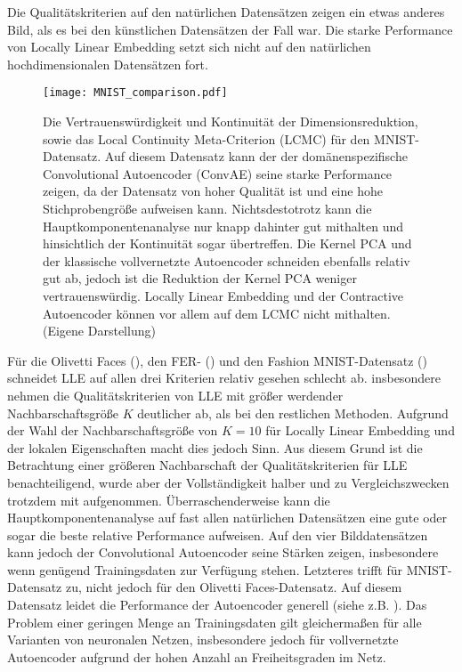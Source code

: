 Die Qualitätskriterien auf den natürlichen Datensätzen zeigen ein etwas anderes Bild, als es bei
den künstlichen Datensätzen der Fall war. Die starke Performance von Locally Linear Embedding setzt
sich nicht auf den natürlichen hochdimensionalen Datensätzen fort.
\begin{figure}[ht]
	\begin{center}
		\texttt{[image: MNIST\_comparison.pdf]}
	\end{center}
	\caption[Qualitätskriterien für MNIST]{Die Vertrauenswürdigkeit und Kontinuität der Dimensionsreduktion, sowie das Local Continuity Meta-Criterion (LCMC) für den MNIST-Datensatz. Auf diesem Datensatz kann der der domänenspezifische Convolutional Autoencoder (ConvAE) seine starke Performance zeigen, da der Datensatz von hoher Qualität ist und eine hohe Stichprobengröße aufweisen kann. Nichtsdestotrotz kann die Hauptkomponentenanalyse nur knapp dahinter gut mithalten und hinsichtlich der Kontinuität sogar übertreffen. Die Kernel PCA und der klassische vollvernetzte Autoencoder schneiden ebenfalls relativ gut ab, jedoch ist die Reduktion der Kernel PCA weniger vertrauenswürdig. Locally Linear Embedding und der Contractive Autoencoder können vor allem auf dem LCMC nicht mithalten. (Eigene Darstellung)}
	\label{fig:MNISTMetrics}
\end{figure}
Für die Olivetti Faces (), den FER- () und den Fashion MNIST-Datensatz ()
schneidet LLE auf allen drei Kriterien relativ gesehen schlecht ab. insbesondere nehmen die
Qualitätskriterien von LLE mit größer werdender Nachbarschaftsgröße $K$ deutlicher ab, als bei den
restlichen Methoden. Aufgrund der Wahl der Nachbarschaftsgröße von $K=10$ für Locally Linear
Embedding und der lokalen Eigenschaften macht dies jedoch Sinn. Aus diesem Grund ist die
Betrachtung einer größeren Nachbarschaft der Qualitätskriterien für LLE benachteiligend, wurde aber
der Vollständigkeit halber und zu Vergleichszwecken trotzdem mit aufgenommen. Überraschenderweise
kann die Hauptkomponentenanalyse auf fast allen natürlichen Datensätzen eine gute oder sogar die
beste relative Performance aufweisen. Auf den vier Bilddatensätzen kann jedoch der Convolutional
Autoencoder seine Stärken zeigen, insbesondere wenn genügend Trainingsdaten zur Verfügung stehen. Letzteres trifft für MNIST-Datensatz  zu, nicht jedoch für den Olivetti Faces-Datensatz.
Auf diesem Datensatz leidet die Performance der Autoencoder generell (siehe z.B. ). Das Problem einer geringen Menge an Trainingsdaten gilt gleichermaßen für alle
Varianten von neuronalen Netzen, insbesondere jedoch für vollvernetzte Autoencoder aufgrund der
hohen Anzahl an Freiheitsgraden im Netz.

